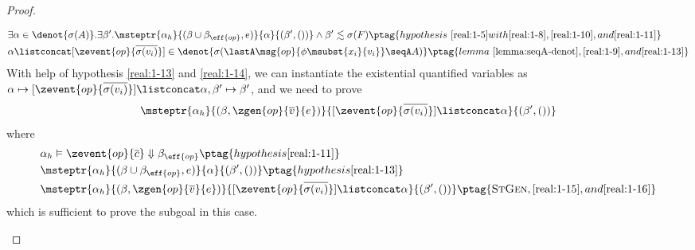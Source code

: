 \begin{proof}
\begin{enumerate}[label=Case]
{\begin{alignat}{2}
&\exists \alpha \in\denot{\sigma(A)}. \exists \beta'. \msteptr{\alpha_h}{(\beta \cup \beta_{\eff{op}}, e)}{\alpha}{(\beta', ())} \land \beta' \realz \sigma(F) \ptag{hypothesis~\ref{real:1-5} with \ref{real:1-8}, \ref{real:1-10}, and \ref{real:1-11}} \label{real:1-13}
\\& \alpha \listconcat [\zevent{op}{\overline{\sigma(v_i)}}] \in \denot{\sigma(\lastA\msg{op}{\phi\msubst{x_i}{v_i}} \seqA A)} \ptag{lemma~\ref{lemma:seqA-denot}, \ref{real:1-9}, and \ref{real:1-13}} \label{real:1-14}
\end{alignat}}\noindent
With help of hypothesis \ref{real:1-13} and \ref{real:1-14}, we can instantiate the existential quantified variables as $\alpha \mapsto [\zevent{op}{\overline{\sigma(v_i)}}] \listconcat \alpha, \beta' \mapsto \beta'$, and we need to prove
{\footnotesize\begin{align*}
    \msteptr{\alpha_h}{(\beta, \zgen{op}{\overline{v}}{e})}{[\zevent{op}{\overline{\sigma(v_i)}}] \listconcat \alpha}{(\beta', ())}
\end{align*}}\noindent
where
{\footnotesize\begin{alignat}{2}
& \alpha_h \vDash \zevent{op}{\overline{c}} \Downarrow \beta_{\eff{op}} \ptag{hypothesis \ref{real:1-11}} \label{real:1-15}
\\& \msteptr{\alpha_h}{(\beta \cup \beta_{\eff{op}}, e)}{\alpha}{(\beta', ())} \ptag{hypothesis \ref{real:1-13}} \label{real:1-16}
\\& \msteptr{\alpha_h}{(\beta, \zgen{op}{\overline{v}}{e})}{ [\zevent{op}{\overline{\sigma(v_i)}}] \listconcat \alpha}{(\beta', ())} \ptag{\textsc{StGen}, \ref{real:1-15}, and \ref{real:1-16}} \label{real:1-17}
\end{alignat}}\noindent
which is sufficient to prove the subgoal in this case.


\end{enumerate}
\end{proof}
